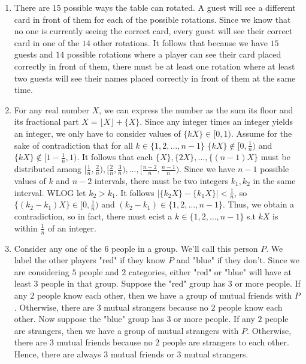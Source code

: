 \documentclass[10pt]{article}
\begin{document}
\begin{enumerate}[label= (Q-\arabic*)]
\begin{itemize}
    \end{itemize}
    \item There are $15$ possible ways the table can rotated. A guest will see a different card in front of them for each of the possible rotations.
    Since we know that no one is currently seeing the correct card, every guest will see their correct card in one of the $14$ other rotations.
    It follows that because we have $15$ guests and $14$ possible rotations where a player can see their card placed correctly in front of them, there must be at least one rotation where at least two guests will see their names placed correctly in front of them at the same time.
    \item For any real number $X$, we can express the number as the sum its floor and its fractional part $X=\lfloor X\rfloor+\{X\}$. 
    Since any integer times an integer yields an integer, we only have to consider values of $\{kX\}\in[0,1)$.
    Assume for the sake of contradiction that for all $k\in\{1,2,\ldots,n-1\}$ $\{kX\}\notin[0,\frac{1}{n})$ and $\{kX\}\notin[1-\frac{1}{n},1)$.
    It follows that each $\{X\},\{2X\},\ldots,\{(n-1)X\}$ must be distributed among $[\frac{1}{n},\frac{2}{n}),[\frac{2}{n},\frac{3}{n}),\ldots,[\frac{n-2}{n},\frac{n-1}{n})$.
    Since we have $n-1$ possible values of $k$ and $n-2$ intervals, there must be two integers $k_1,k_2$ in the same interval. 
    WLOG let $k_2>k_1$. It follows $|\{k_2X\}-\{k_1X\}|<\frac{1}{n}$, so $\{(k_2-k_1)X\}\in[0,\frac{1}{n})$ and $(k_2-k_1)\in\{1,2,\ldots,n-1\}$. 
    Thus, we obtain a contradiction, so in fact, there must ecist a $k\in\{1,2,\ldots,n-1\}$ s.t $kX$ is within $\frac{1}{n}$ of an integer.
    \item Consider any one of the $6$ people in a group. We'll call this person $P$. 
    We label the other players "red" if they know $P$ and "blue" if they don't.
    Since we are considering $5$ people and $2$ categories, either "red" or "blue" will have at least $3$ people in that group.
    Suppose the "red" group has $3$ or more people. 
    If any $2$ people know each other, then we have a group of mutual friends with $P$. 
    Otherwise, there are $3$ mutual strangers because no $2$ people know each other.
    Now suppose the "blue" group has $3$ or more people.
    If any $2$ people are strangers, then we have a group of mutual strangers with $P$.
    Otherwise, there are $3$ mutual friends because no $2$ people are strangers to each other.
    Hence, there are always $3$ mutual friends or $3$ mutual strangers.
\end{enumerate}
\end{document}
